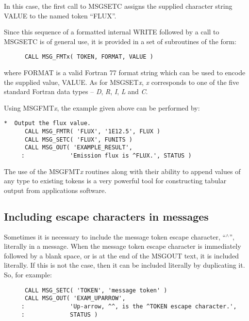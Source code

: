 \documentclass[twoside,11pt]{article}
\newcommand{\xlabel}[1]{}
\renewcommand{\_}{\texttt{\symbol{95}}}
\begin{document}
In this case, the first call to MSG\_SETC assigns the supplied character 
string VALUE to the named token ``FLUX''.

Since this sequence of a formatted internal WRITE followed by a call to
MSG\_SETC is of general use, it is provided in a set of subroutines of the
form:

\begin {small}
\begin{verbatim}
      CALL MSG_FMTx( TOKEN, FORMAT, VALUE )
\end{verbatim}
\end {small}

where FORMAT is a valid Fortran 77 format string which can be used to
encode the supplied value, VALUE.
As for MSG\_SET\textit{x}, \textit{x} corresponds to one of the five standard
Fortran data types -- \textit{D}, \textit{R}, \textit{I}, \textit{L} and \textit{C}.

Using MSG\_FMT\textit{x}, the example given above can be performed by:

\begin {small}
\begin{verbatim}
*  Output the flux value.
      CALL MSG_FMTR( 'FLUX', '1E12.5', FLUX )
      CALL MSG_SETC( 'FLUX', FUNITS )
      CALL MSG_OUT( 'EXAMPLE_RESULT', 
     :             'Emission flux is ^FLUX.', STATUS )
\end{verbatim}
\end {small}

The use of the MSG\_FMT\textit{x} routines along with their ability to append 
values of any type to existing tokens is a very powerful tool for constructing 
tabular output from applications software.


\subsection{\xlabel{including_escape_characters_in_messages}Including escape characters in messages}
Sometimes it is necessary to include the message token escape character,
``$^\wedge$'', literally in a message. 
When the message token escape character is immediately followed by a blank
space, or is at the end of the MSG\_OUT text, it is included literally. 
If this is not the case, then it can be included literally by duplicating it.
So, for example:

\begin {small}
\begin{verbatim}
      CALL MSG_SETC( 'TOKEN', 'message token' )
      CALL MSG_OUT( 'EXAM_UPARROW', 
     :             'Up-arrow, ^^, is the ^TOKEN escape character.', 
     :             STATUS )
\end{verbatim}
\end {small}
\end{document}
